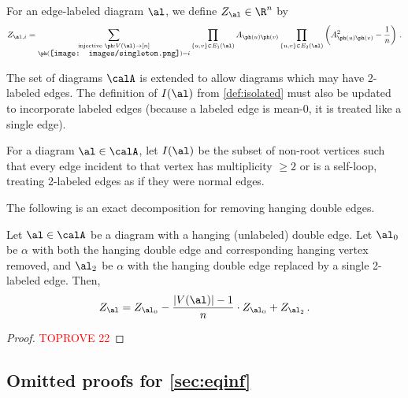 \documentclass[12pt]{article}
\newcommand{\smallrootpic}{\vcenter{\hbox{\texttt{[image: images/singleton.png]}}}}
\begin{document}
\begin{definition}
    For an edge-labeled diagram $\al$, we define $Z_\al \in \R^n$ by
    \[Z_{\al, i} = \sum_{\substack{\textnormal{injective }\ph: V(\al) \to [n]\\\ph(\smallrootpic) = i}} \prod_{\{u,v\} \in E_1(\al)} A_{\ph(u)\ph(v)} \prod_{\{u,v\} \in E_2(\al)} \left(A_{\ph(u)\ph(v)}^2 - \frac{1}{n}\right)\,.\]
\end{definition}


The set of diagrams $\calA$ is extended to allow diagrams which may have 2-labeled edges.
The definition of $I(\al)$ from \cref{def:isolated} must also be updated to incorporate labeled edges
(because a labeled edge is mean-0, it is treated like a single edge).
\begin{definition}
     For a diagram $\al \in \calA$, let $I(\al)$ be the subset
     of non-root vertices such that every edge incident to that vertex has multiplicity $\geq 2$ or is a self-loop, treating 2-labeled edges as if they were normal edges.
 \end{definition}


The following is an exact decomposition for removing hanging double edges.
\begin{lemma}\label{lem:syntactic-removal}
    Let $\al \in \calA$ be a diagram with a hanging (unlabeled) double edge. Let $\al_0$ be $\alpha$ with both the hanging double edge and corresponding hanging vertex removed, and $\al_2$ be $\alpha$ with the hanging double edge replaced by a single 2-labeled edge. Then,
        \[
            Z_\al = Z_{\al_0} - \frac{|V(\al)|-1}{n} \cdot Z_{\al_0} + Z_{\al_2}\,.
        \]
\end{lemma}

\begin{proof}\textcolor{red}{TOPROVE 22}\end{proof}


\subsection{Omitted proofs for \texorpdfstring{\cref{sec:eqinf}}{Section~\ref{sec:eqinf}}}
\label{sec:omitted-combneg}
\end{document}
